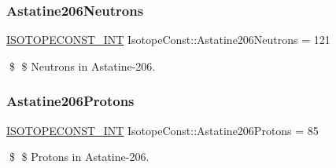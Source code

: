 \subsubsection{\texorpdfstring{Astatine206\+Neutrons}{Astatine206Neutrons}}
{\footnotesize\ttfamily \mbox{\hyperlink{group___isotope_const-_macros_ga5f18360b3e99483a35c32d789e62621c}{I\+S\+O\+T\+O\+P\+E\+C\+O\+N\+S\+T\+\_\+\+I\+NT}} Isotope\+Const\+::\+Astatine206\+Neutrons = 121}

\$ \$ Neutrons in Astatine-\/206. \mbox{\label{group___isotope_const-_astatine-_at206_ga549b5c99a7fae2dfb0a259b76832d96d}} 
\subsubsection{\texorpdfstring{Astatine206\+Protons}{Astatine206Protons}}
{\footnotesize\ttfamily \mbox{\hyperlink{group___isotope_const-_macros_ga5f18360b3e99483a35c32d789e62621c}{I\+S\+O\+T\+O\+P\+E\+C\+O\+N\+S\+T\+\_\+\+I\+NT}} Isotope\+Const\+::\+Astatine206\+Protons = 85}

\$ \$ Protons in Astatine-\/206. 